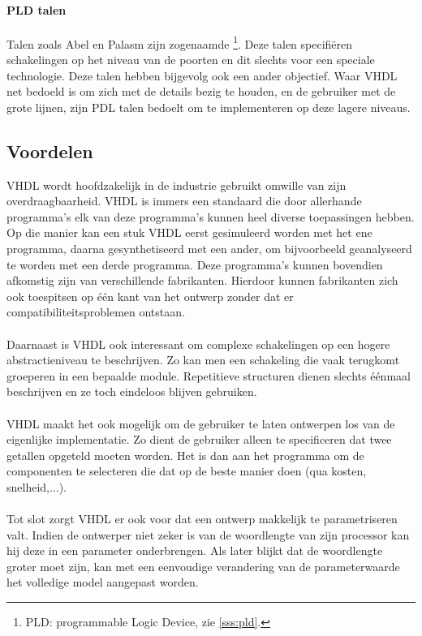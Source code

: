 \paragraph{PLD talen}
Talen zoals Abel en Palasm zijn zogenaamde \footnote{PLD: programmable Logic Device, zie \ref{sss:pld}.}. Deze talen specifi\"eren schakelingen op het niveau van de poorten en dit slechts voor een speciale technologie. Deze talen hebben bijgevolg ook een ander objectief. Waar VHDL net bedoeld is om zich met de details bezig te houden, en de gebruiker met de grote lijnen, zijn PDL talen bedoelt om te implementeren op deze lagere niveaus.
\subsection{Voordelen}
VHDL wordt hoofdzakelijk in de industrie gebruikt omwille van zijn overdraagbaarheid. VHDL is immers een standaard die door allerhande programma's elk van deze programma's kunnen heel diverse toepassingen hebben. Op die manier kan een stuk VHDL eerst gesimuleerd worden met het ene programma, daarna gesynthetiseerd met een ander, om bijvoorbeeld geanalyseerd te worden met een derde programma. Deze programma's kunnen bovendien afkomstig zijn van verschillende fabrikanten. Hierdoor kunnen fabrikanten zich ook toespitsen op \'e\'en kant van het ontwerp zonder dat er compatibiliteitsproblemen ontstaan.
\paragraph{}
Daarnaast is VHDL ook interessant om complexe schakelingen op een hogere abstractieniveau te beschrijven. Zo kan men een schakeling die vaak terugkomt groeperen in een bepaalde module. Repetitieve structuren dienen slechts \'e\'enmaal beschrijven en ze toch eindeloos blijven gebruiken.
\paragraph{}
VHDL maakt het ook mogelijk om de gebruiker te laten ontwerpen los van de eigenlijke implementatie. Zo dient de gebruiker alleen te specificeren dat twee getallen opgeteld moeten worden. Het is dan aan het programma om de componenten te selecteren die dat op de beste manier doen (qua kosten, snelheid,...).
\paragraph{}
Tot slot zorgt VHDL er ook voor dat een ontwerp makkelijk te parametriseren valt. Indien de ontwerper niet zeker is van de woordlengte van zijn processor kan hij deze in een parameter onderbrengen. Als later blijkt dat de woordlengte groter moet zijn, kan met een eenvoudige verandering van de parameterwaarde het volledige model aangepast worden.
